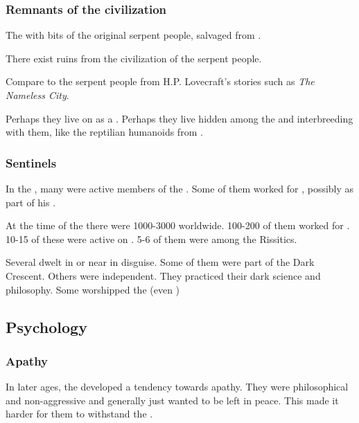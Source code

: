 \subsubsection{Remnants of the \ophidian{} civilization}
The \scathae{}  with bits of the original serpent people, salvaged from . 

There exist ruins from the civilization of the serpent people. 

Compare to the serpent people from H.P. Lovecraft's stories such as \emph{The Nameless City}.

Perhaps they live on as a . Perhaps they live hidden among the \scathae{} and interbreeding with them, like the reptilian humanoids from \DIBiggestSecret. 





\subsubsection{Sentinels}
In the , many \quiljaaran were active members of the . 
Some of them worked for , possibly as part of his . 

At the time of the \thirdbanewar there were 1000-3000 \quiljaaran worldwide. 
100-200 of them worked for \Secherdamon.
10-15 of these were active on \Azmith.
5-6 of them were among the Rissitics. 

Several \quiljaaran dwelt in or near \Yormis in disguise. 
Some of them were part of the Dark Crescent.
Others were independent.
They practiced their dark science and philosophy. 
Some worshipped the \xs (even \Ubloth) 









\subsection{Psychology}





\subsubsection{Apathy}
In later ages, the \quiljaaran developed a tendency towards apathy. 
They were philosophical and non-aggressive and generally just wanted to be left in peace. 
This made it harder for them to withstand the . 

